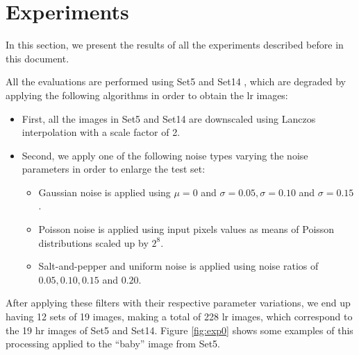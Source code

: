 \section{Experiments}\label{sec:experiments}
In this section, we present the results of all the experiments described before in this document.  

All the evaluations are performed using Set5 \cite{SET5} and Set14 \cite{SET14}, which are degraded by applying the following algorithms in order to obtain the \gls{lr} images:

\begin{itemize}
\item First, all the images in Set5 and Set14 are downscaled using Lanczos interpolation with a scale factor of 2. 
\item Second, we apply one of the following noise types varying the noise parameters in order to enlarge the test set:
\begin{itemize}
	\item Gaussian noise is applied using $\mu=0$ and $\sigma = 0.05, \sigma = 0.10$ and $\sigma = 0.15$.
	\item Poisson noise is applied using input pixels values as means of Poisson distributions scaled up by $2^8$.
	\item Salt-and-pepper and uniform noise is applied using noise ratios of $0.05, 0.10, 0.15$ and $0.20$.
\end{itemize}
\end{itemize}

After applying these filters with their respective parameter variations, we end up having 12 sets of 19 images, making a total of 228 \gls{lr} images, which correspond to the 19 \gls{hr} images of Set5 and Set14. Figure \ref{fig:exp0} shows some examples of this processing applied to the ``baby'' image from Set5.

